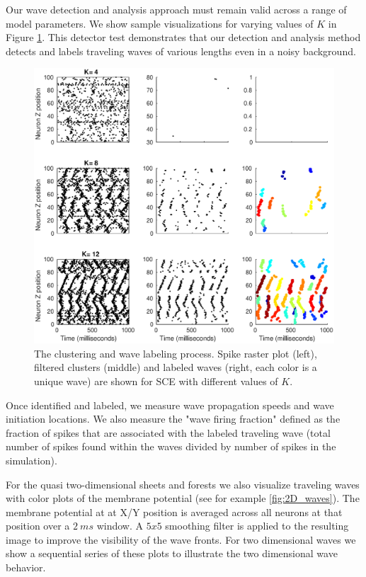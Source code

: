 Our wave detection and analysis approach must remain valid across a range of model parameters. 
We show sample visualizations for varying values of $K$ in Figure \ref{fig:detector_test}.
This detector test demonstrates that our detection and analysis method detects and labels traveling waves of various lengths even in a noisy background.
\begin{figure}[!htb]
 \centering
   \includegraphics[width=\textwidth]{fig/DetectorTest}
    \caption{The clustering and wave labeling process. Spike raster plot (left), filtered clusters (middle) and labeled waves (right, each color is a unique wave) 
	    are shown for SCE with different values of $K$. }
  \label{fig:detector_test}
\end{figure}

\FloatBarrier
Once identified and labeled, we measure wave propagation speeds and wave initiation locations. 
We also measure the "wave firing fraction" defined as the fraction of spikes that are associated with the labeled traveling wave (total number of spikes found within the waves divided by number of spikes in the simulation). 

For the quasi two-dimensional sheets and forests we also visualize traveling waves with color plots of the membrane potential (see for example \ref{fig:2D_waves}).
The membrane potential at at X/Y position is averaged across all neurons at that position over a $2~ms$ window.
A $5x5$ smoothing filter is applied to the resulting image to improve the visibility of the wave fronts. 
For two dimensional waves we show a sequential series of these plots to illustrate the two dimensional wave behavior.

